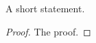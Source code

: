 \begin{theorem}
  \label{thm:sharp}
  A short statement.
\end{theorem}

\begin{proof}
  \label{prf:sharp}
  The proof.
\end{proof}
